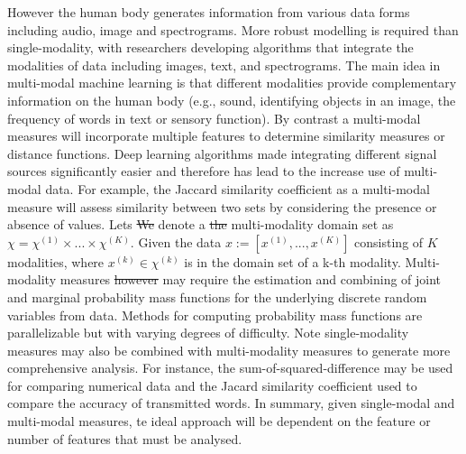 \documentclass[10pt]{article}[draft]
\begin{document}
\begin{itemize}
		However the human body generates information from various data forms including audio, image and spectrograms. More robust modelling is required than single-modality, with researchers developing algorithms that integrate the modalities of data including images, text, and spectrograms. The main idea in multi-modal machine learning is that different modalities provide complementary information on the human body (e.g., sound, identifying objects in an image, the frequency of words in text or sensory function).  By contrast a multi-modal measures will incorporate multiple  features to determine similarity measures or distance functions. Deep learning algorithms made integrating different signal sources significantly easier and therefore has lead to the increase use of multi-modal data.  For example, the Jaccard similarity coefficient as a multi-modal measure will assess similarity between two sets by considering the presence or absence of  values. Lets \st{We} denote a \st{the} multi-modality domain set as $\chi =  \chi^{(1)} \times ... \times \chi^{(K)} $. Given the data $x := [x^{(1)}, ... , x^{(K)}]$ consisting of $K$ modalities, where $x^{(k)}  \in \chi^{(k)}$ is in the domain set of a k-th modality. Multi-modality measures \st{however} may require the estimation and combining of joint and marginal probability mass functions for the underlying discrete random variables from data. Methods for computing probability mass functions  are parallelizable but with varying degrees of difficulty. Note single-modality measures may also be combined with multi-modality measures to generate more comprehensive analysis. For instance, the sum-of-squared-difference may be used for comparing numerical data and the Jacard similarity coefficient used to compare the accuracy of transmitted words. In summary, given single-modal and multi-modal measures, te ideal approach will be dependent on the feature or number of features that must be analysed.
		

\end{itemize}
\end{document}

